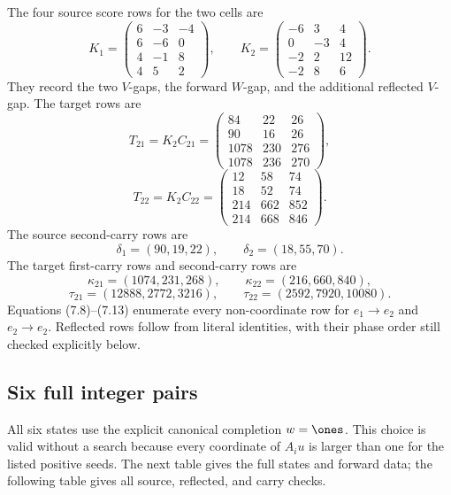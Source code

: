 \documentclass[11pt]{article}
\theoremstyle{definition}
\theoremstyle{remark}
\begin{document}
The four source score rows for the two cells are
\[
 K_1=\begin{pmatrix}
6&-3&-4\\6&-6&0\\4&-1&8\\4&5&2
\end{pmatrix},\qquad
 K_2=\begin{pmatrix}
-6&3&4\\0&-3&4\\-2&2&12\\-2&8&6
\end{pmatrix}.
\tag{7.8}
\]
They record the two \(V\)-gaps, the forward \(W\)-gap, and the additional
reflected \(V\)-gap.  The target rows are
\[
 T_{21}=K_2C_{21}
 =\begin{pmatrix}
84&22&26\\90&16&26\\1078&230&276\\1078&236&270
\end{pmatrix},
\tag{7.9}
\]
\[
 T_{22}=K_2C_{22}
 =\begin{pmatrix}
12&58&74\\18&52&74\\214&662&852\\214&668&846
\end{pmatrix}.
\tag{7.10}
\]
The source second-carry rows are
\[
 \delta_1=(90,19,22),\qquad \delta_2=(18,55,70).
\tag{7.11}
\]
The target first-carry rows and second-carry rows are
\[
 \kappa_{21}=(1074,231,268),\qquad
 \kappa_{22}=(216,660,840),
\tag{7.12}
\]
\[
 \tau_{21}=(12888,2772,3216),\qquad
 \tau_{22}=(2592,7920,10080).
\tag{7.13}
\]
Equations (7.8)--(7.13) enumerate every non-coordinate row for
\(e_1\to e_2\) and \(e_2\to e_2\).  Reflected rows follow from literal
identities, with their phase order still checked explicitly below.

\subsection{Six full integer pairs}

All six states use the explicit canonical completion \(w=\ones\).  This
choice is valid without a search because every coordinate of \(A_i u\) is
larger than one for the listed positive seeds.  The next table gives the
full states and forward data; the following table gives all source,
reflected, and carry checks.
\end{document}
